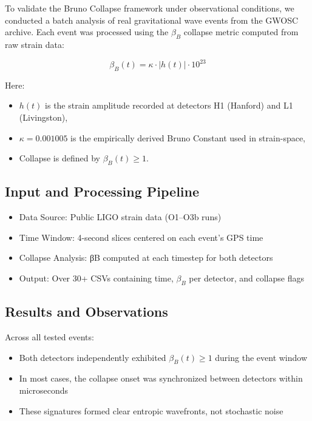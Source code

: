\documentclass[12pt]{article}
\begin{document}
To validate the Bruno Collapse framework under observational conditions, we conducted a batch analysis of real gravitational wave events from the GWOSC archive. Each event was processed using the $\beta_B$ collapse metric computed from raw strain data:
\FloatBarrier

\begin{equation}
\beta_B(t) = \kappa \cdot |h(t)| \cdot 10^{23}
\end{equation}

Here:
\begin{itemize}
  \item $h(t)$ is the strain amplitude recorded at detectors H1 (Hanford) and L1 (Livingston),
  \item $\kappa = 0.001005$ is the empirically derived Bruno Constant used in strain-space,
  \item Collapse is defined by $\beta_B(t) \geq 1$.
\end{itemize}

\clearpage
\FloatBarrier
\subsection*{Input and Processing Pipeline}

\begin{itemize}
  \item Data Source: Public LIGO strain data (O1–O3b runs)
  \item Time Window: 4-second slices centered on each event’s GPS time
  \item Collapse Analysis: βB computed at each timestep for both detectors
  \item Output: Over 30+ CSVs containing time, $\beta_B$ per detector, and collapse flags
\end{itemize}

\clearpage
\subsection*{Results and Observations}

\FloatBarrier
Across all tested events:

\begin{itemize}
  \item Both detectors independently exhibited $\beta_B(t) \geq 1$ during the event window
  \item In most cases, the collapse onset was synchronized between detectors within microseconds
  \item These signatures formed clear entropic wavefronts, not stochastic noise
\end{itemize}
\end{document}
